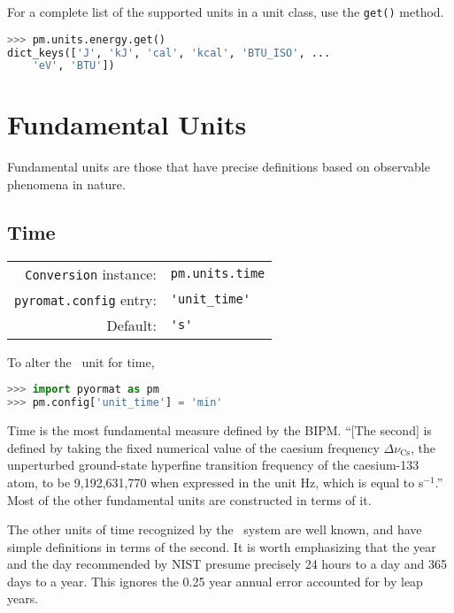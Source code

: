 For a complete list of the supported units in a unit class, use the \verb|get()| method.
\begin{lstlisting}[language=Python]
>>> pm.units.energy.get()
dict_keys(['J', 'kJ', 'cal', 'kcal', 'BTU_ISO', ...
    'eV', 'BTU'])
\end{lstlisting}


\section{Fundamental Units}

Fundamental units are those that have precise definitions based on observable phenomena in nature.  

%
%

\subsection{Time}\label{sec:units:time}

\begin{tabular}{rl}
\hline
\verb|Conversion| instance: & \verb|pm.units.time|\\
\verb|pyromat.config| entry: & \verb|'unit_time'|\\
Default: & \verb|'s'|\\
\hline
\end{tabular}
\vspace{1em}

To alter the \PM\ unit for time,
\begin{lstlisting}[language=Python]
>>> import pyormat as pm
>>> pm.config['unit_time'] = 'min'
\end{lstlisting}

Time is the most fundamental measure defined by the BIPM.  ``[The second] is defined by taking the fixed numerical value of the caesium frequency $\Delta \nu_\mathrm{Cs}$, the unperturbed ground-state hyperfine transition frequency of the caesium-133 atom, to be 9,192,631,770 when expressed in the unit Hz, which is equal to s$^{-1}$.''\cite{bipm}  Most of the other fundamental units are constructed in terms of it.

The other units of time recognized by the \PM\ system are well known, and have simple definitions in terms of the second.  It is worth emphasizing that the year and the day recommended by NIST \cite{nist:sp811} presume precisely 24 hours to a day and 365 days to a year.  This ignores the 0.25 year annual error accounted for by leap years.

